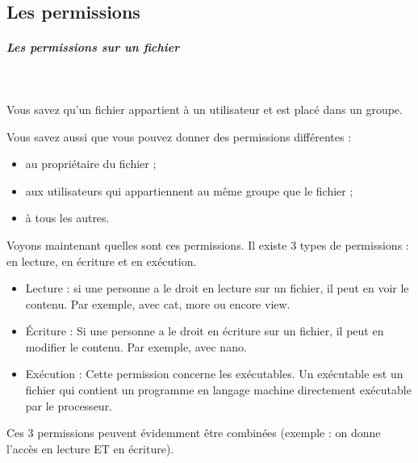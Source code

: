\documentclass[11pt,a4paper]{article}
\begin{document}
            \par
        \subsection{Les permissions}
			
		\subparagraph{Les permissions sur un fichier} 
		
					\textcolor{white}{.} \par
				
            \par
        
					Vous savez qu'un fichier appartient \`a un utilisateur et est plac\'e dans un groupe.
				
            \par
        
					Vous savez aussi que vous pouvez donner des permissions diff\'erentes :
					
					\begin{itemize}
				
			\item au propri\'etaire du fichier ;
			\item aux utilisateurs qui appartiennent au m\^eme groupe que le fichier ;
			\item  \`a tous les autres. 
					\end{itemize}
				
            \par
        
					Voyons maintenant quelles sont ces permissions.
					Il existe 3 types de permissions : en lecture, en \'ecriture et en ex\'ecution.
					
					\begin{itemize}
				
			\item Lecture : si une personne a le droit en lecture sur un fichier, il peut en voir le contenu. Par exemple, avec cat, more ou encore view.
			\item \'Ecriture : Si une personne a le droit en \'ecriture sur un fichier, il peut en modifier le contenu. Par exemple, avec nano.
			\item Ex\'ecution : Cette permission concerne les ex\'ecutables. Un ex\'ecutable est un fichier qui contient un programme en langage machine directement ex\'ecutable par le processeur.
					\end{itemize}
				
          Ces 3 permissions peuvent \'evidemment \^etre combin\'ees (exemple : on donne l'acc\`es en lecture ET en \'ecriture). 
				
\end{document}
